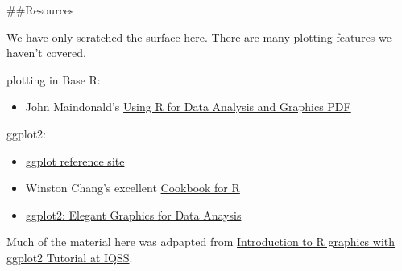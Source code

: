 \documentclass[11pt,]{article}
\providecommand{\tightlist}{%
  \setlength{\itemsep}{0pt}\setlength{\parskip}{0pt}}
\begin{document}
\#\#Resources

We have only scratched the surface here. There are many plotting
features we haven't covered.

plotting in Base R:

\begin{itemize}
\tightlist
\item
  John Maindonald's
  \href{https://cran.r-project.org/doc/contrib/usingR.pdf}{Using R for
  Data Analysis and Graphics PDF}
\end{itemize}

ggplot2:

\begin{itemize}
\tightlist
\item
  \href{http://docs.ggplot2.org/}{ggplot reference site}
\item
  Winston Chang's excellent \href{http://www.cookbook-r.com}{Cookbook
  for R}
\item
  \href{http://www.amazon.com/ggplot2-Elegant-Graphics-Data-Analysis/dp/0387981403}{ggplot2:
  Elegant Graphics for Data Anaysis}
\end{itemize}

Much of the material here was adpapted from
\href{http://tutorials.iq.harvard.edu/R/Rgraphics/Rgraphics.html}{Introduction
to R graphics with ggplot2 Tutorial at IQSS}.
\end{document}
